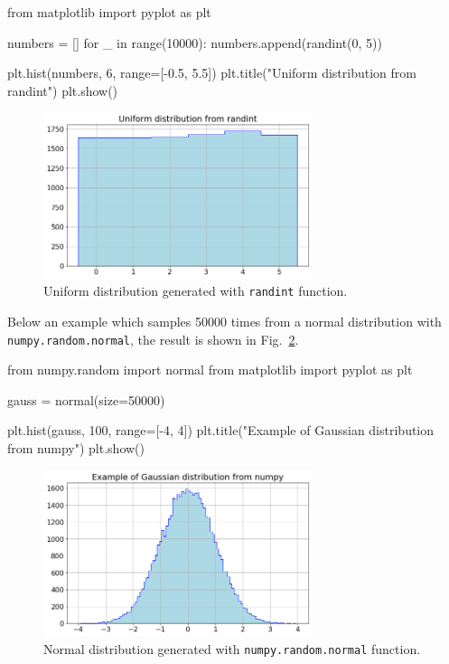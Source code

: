 \begin{ipython}
from matplotlib import pyplot as plt

numbers = []
for _ in range(10000):
    numbers.append(randint(0, 5))

plt.hist(numbers, 6, range=[-0.5, 5.5])
plt.title("Uniform distribution from randint")
plt.show()
\end{ipython}

\begin{figure}[h]
\centering
\includegraphics[width=0.7\textwidth]{figures/uniform}
\caption{Uniform distribution generated with \texttt{randint} function.}
\label{fig:uniform_dist}
\end{figure}
    
Below an example which samples 50000 times from a normal distribution  with \texttt{numpy.random.normal}, the result is shown in Fig.~\ref{fig:gauss_dist}.

\begin{ipython}
from numpy.random import normal
from matplotlib import pyplot as plt

gauss = normal(size=50000)

plt.hist(gauss, 100, range=[-4, 4])
plt.title("Example of Gaussian distribution from numpy")
plt.show()
\end{ipython}

\begin{figure}
\centering
\includegraphics[width=0.7\textwidth]{figures/standard_normal}
\caption{Normal distribution generated with \texttt{numpy.random.normal} function.}
\label{fig:gauss_dist}
\end{figure}

